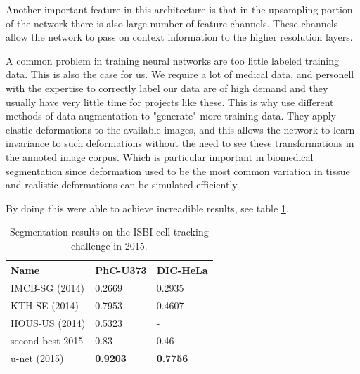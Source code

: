\documentclass[english, a4paper]{report}
\begin{document}
Another important feature in this architecture is that in the upsampling portion of the network there is also large number of feature channels. These channels allow the network to pass on context information to the higher resolution layers. 

A common problem in training neural networks are too little labeled training data. This is also the case for us. We require a lot of medical data, and personell with the expertise to correctly label our data are of high demand and they usually have very little time for projects like these. This is why \citeauthor*{UNetConvolutional15} use different methods of data augmentation to "generate" more training data. They apply elastic deformations to the available images, and this allows the network to learn invariance to such deformations without the need to see these transformations in the annoted image corpus. Which is particular important in biomedical segmentation since deformation used to be the most common variation in tissue and realistic deformations can be simulated efficiently. \cite{UNetConvolutional15}

By doing this \citeauthor*{UNetConvolutional15} were able to achieve increadible results, see table \ref{table:segmentation_results}.

\begin{table} %
  \centering
  \begin{tabular}{ l l l }
  	\hline
    Name &				PhC-U373 &			DIC-HeLa 		\\
    \hline
    IMCB-SG (2014) &	0.2669 & 			0.2935 			\\
    KTH-SE (2014) &		0.7953 & 			0.4607 			\\ 
    HOUS-US (2014) &	0.5323 & 			- 				\\ 
    second-best 2015 &	0.83 & 				0.46 			\\
    u-net (2015) &		\textbf{0.9203} & 	\textbf{0.7756} \\
    \hline
  \end{tabular}
  \caption{Segmentation results on the ISBI cell tracking challenge in 2015.}
  \label{table:segmentation_results}
\end{table}
\end{document}
